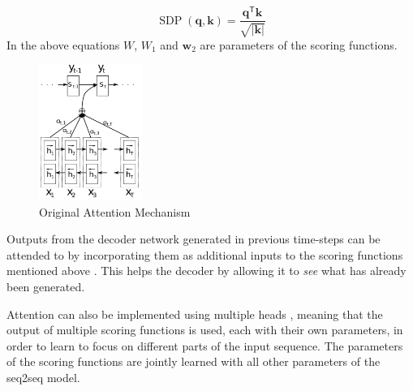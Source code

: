 \documentclass[12pt]{article}
\DeclareMathOperator{\SDP}{SDP}
\begin{document}
\begin{equation} \label{eq:sdp}
\SDP(\bm{q},\bm{k})=\frac{\bm{q}^\mathsf{T}\bm{k}}{\sqrt{|\bm{k}|}}
\end{equation}
In the above equations \(W\), \(W_1\) and \(\bm{w}_2\) are parameters of the scoring functions.
\begin{figure}[H]
	\centering
	\includegraphics[width=0.3\textwidth]{pics/bahdanau_attn.png}
	\caption{Original Attention Mechanism \cite{Bahdanau:2014}}
	\label{fig:attentiona}
\end{figure}
Outputs from the decoder network generated in previous time-steps can be attended to by incorporating them as additional inputs to the scoring functions mentioned above \cite{Shao:2017}. This helps the decoder by allowing it to \textit{see} what has already been generated.

Attention can also be implemented using multiple heads \cite{Vaswani:2017}, meaning that the output of multiple scoring functions is used, each with their own parameters, in order to learn to focus on different parts of the input sequence. The parameters of the scoring functions are jointly learned with all other parameters of the seq2seq model.
\end{document}

